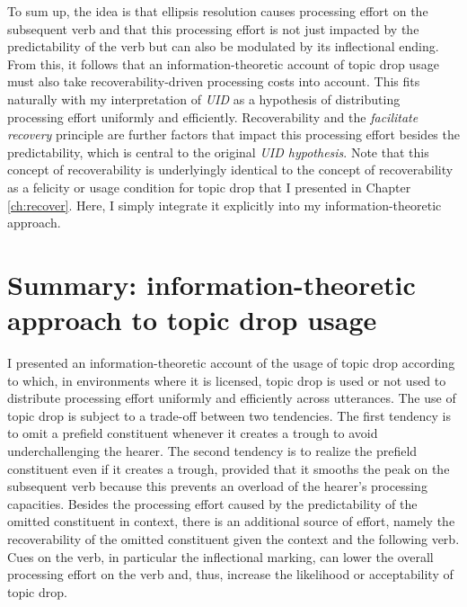 To sum up, the idea is that ellipsis resolution causes processing effort on the subsequent verb and that this processing effort is not just impacted by the predictability  of the verb but can also be modulated by its inflectional ending. 
From this, it follows that an information-theoretic account of topic drop usage must also take recoverability-driven processing costs into account.
This fits naturally with my interpretation of \textit{UID} as a hypothesis of distributing processing effort uniformly and efficiently.
Recoverability and the \textit{facilitate recovery} principle are further factors that impact this processing effort besides the predictability, which is central to the original \textit{UID hypothesis}.
Note that this concept of recoverability is underlyingly identical to the concept of recoverability as a felicity or usage condition for topic drop that I presented in Chapter \ref{ch:recover}.
Here, I simply integrate it explicitly into my information-theoretic approach.

\section{Summary: information-theoretic approach to topic drop usage}\label{sec:info.theory.summary}
I presented an information-theoretic account of the usage of topic drop according to which, in environments where it is licensed, topic drop is used or not used to distribute processing effort uniformly and efficiently across utterances.
The use of topic drop is subject to a trade-off between two tendencies.
The first tendency is to omit a prefield constituent whenever it creates a trough to avoid underchallenging the hearer.
The second tendency is to realize the prefield constituent even if it creates a trough, provided that it smooths the peak on the subsequent verb because this prevents an overload of the hearer's processing capacities. 
Besides the processing effort caused by the predictability of the omitted constituent in context, there is an additional source of effort, namely the recoverability  of the omitted constituent given the context and the following verb.
Cues on the verb, in particular the inflectional marking,  can lower the overall processing effort on the verb and, thus, increase the likelihood or acceptability of topic drop.

